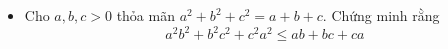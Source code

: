 \documentclass[11pt]{scrartcl}
\begin{document}
\begin{itemize}[label=, leftmargin=0em, itemsep=-0em]
        \item\begin{btvn}
            Cho $a,b,c > 0$ thỏa mãn $a^2 + b^2 + c^2 = a + b + c$. Chứng minh rằng 
            \[
                a^2b^2 + b^2c^2 + c^2a^2 \leq ab + bc + ca
            \]
        \end{btvn}

        
    
    

\end{itemize}
\end{document}
